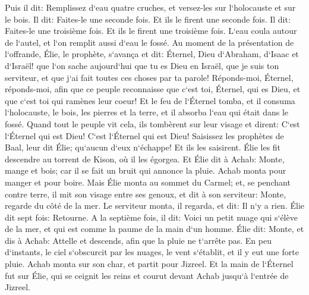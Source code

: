 \verse Puis il dit: Remplissez d`eau quatre cruches, et versez-les sur l`holocauste et sur le bois. Il dit: Faites-le une seconde fois. Et ils le firent une seconde fois. Il dit: Faites-le une troisième fois. Et ils le firent une troisième fois. 
\verse L`eau coula autour de l`autel, et l`on remplit aussi d`eau le fossé. 
\verse Au moment de la présentation de l`offrande, Élie, le prophète, s`avança et dit: Éternel, Dieu d`Abraham, d`Isaac et d`Israël! que l`on sache aujourd`hui que tu es Dieu en Israël, que je suis ton serviteur, et que j`ai fait toutes ces choses par ta parole! 
\verse Réponds-moi, Éternel, réponds-moi, afin que ce peuple reconnaisse que c`est toi, Éternel, qui es Dieu, et que c`est toi qui ramènes leur coeur! 
\verse Et le feu de l`Éternel tomba, et il consuma l`holocauste, le bois, les pierres et la terre, et il absorba l`eau qui était dans le fossé. 
\verse Quand tout le peuple vit cela, ils tombèrent sur leur visage et dirent: C`est l`Éternel qui est Dieu! C`est l`Éternel qui est Dieu! 
\verse Saisissez les prophètes de Baal, leur dit Élie; qu`aucun d`eux n`échappe! Et ils les saisirent. Élie les fit descendre au torrent de Kison, où il les égorgea. 
\verse Et Élie dit à Achab: Monte, mange et bois; car il se fait un bruit qui annonce la pluie. 
\verse Achab monta pour manger et pour boire. Mais Élie monta au sommet du Carmel; et, se penchant contre terre, il mit son visage entre ses genoux, 
\verse et dit à son serviteur: Monte, regarde du côté de la mer. Le serviteur monta, il regarda, et dit: Il n`y a rien. Élie dit sept fois: Retourne. 
\verse A la septième fois, il dit: Voici un petit nuage qui s`élève de la mer, et qui est comme la paume de la main d`un homme. Élie dit: Monte, et dis à Achab: Attelle et descends, afin que la pluie ne t`arrête pas. 
\verse En peu d`instants, le ciel s`obscurcit par les nuages, le vent s`établit, et il y eut une forte pluie. Achab monta sur son char, et partit pour Jizreel. 
\verse Et la main de l`Éternel fut sur Élie, qui se ceignit les reins et courut devant Achab jusqu`à l`entrée de Jizreel. 

